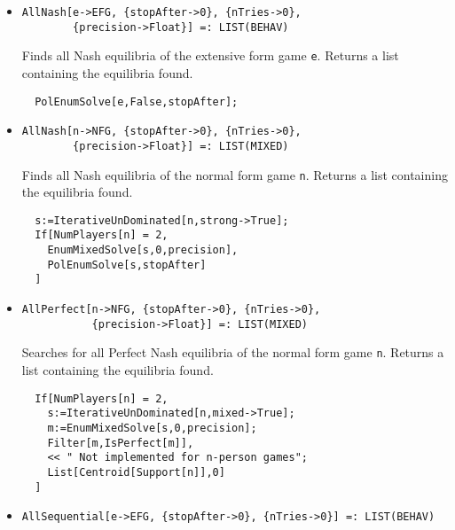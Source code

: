 \begin{itemize}
\item{}
\protect \large \begin{verbatim}
AllNash[e->EFG, {stopAfter->0}, {nTries->0}, 
        {precision->Float}] =: LIST(BEHAV) 
\end{verbatim}\normalsize

\bd 
Finds all Nash equilibria of the extensive form game
\verb+e+.  Returns a list containing the equilibria found.

\begin{verbatim}
  PolEnumSolve[e,False,stopAfter];
\end{verbatim} 
\ed

\item{}
\protect \large \begin{verbatim}
AllNash[n->NFG, {stopAfter->0}, {nTries->0}, 
        {precision->Float}] =: LIST(MIXED) 
\end{verbatim}\normalsize

\bd 
Finds all Nash equilibria of the normal form game
\verb+n+.  Returns a list containing the equilibria found.

\begin{verbatim}
  s:=IterativeUnDominated[n,strong->True];
  If[NumPlayers[n] = 2, 
    EnumMixedSolve[s,0,precision],
    PolEnumSolve[s,stopAfter]
  ]
\end{verbatim} 
\ed

\item{}
\protect \large \begin{verbatim}
AllPerfect[n->NFG, {stopAfter->0}, {nTries->0}, 
           {precision->Float}] =: LIST(MIXED) 
\end{verbatim}\normalsize

\bd 
Searches for all Perfect Nash equilibria of the normal form game
\verb+n+.  Returns a list containing the equilibria found.

\begin{verbatim}
  If[NumPlayers[n] = 2, 
    s:=IterativeUnDominated[n,mixed->True];
    m:=EnumMixedSolve[s,0,precision];
    Filter[m,IsPerfect[m]],
    << " Not implemented for n-person games";
    List[Centroid[Support[n]],0]
  ]
\end{verbatim} 
\ed

\item{}
\protect \large \begin{verbatim}
AllSequential[e->EFG, {stopAfter->0}, {nTries->0}] =: LIST(BEHAV) 
\end{verbatim}\normalsize


\end{itemize}
